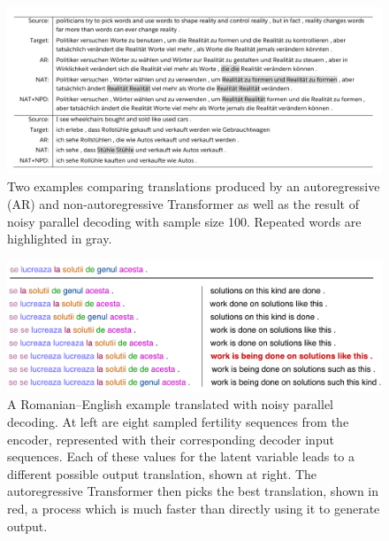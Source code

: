 \begin{figure}[htpb]
\includegraphics[width=\textwidth]{figs/nat/examples1}
\caption{\label{cp8.fig.ex} Two examples comparing translations produced by an autoregressive (AR) and non-autoregressive Transformer as well as the result of noisy parallel decoding with sample size 100. Repeated words are highlighted in gray.}
\end{figure}
\begin{figure}[htpb]
\centering
\includegraphics[width=\textwidth]{figs/nat/fertility_example2}
\caption{\label{cp8.fig.fer} A Romanian--English example translated with noisy parallel decoding. At left are eight sampled fertility sequences from the encoder, represented with their corresponding decoder input sequences. Each of these values for the latent variable leads to a different possible output translation, shown at right. The autoregressive Transformer then picks the best translation, shown in red, a process which is much faster than directly using it to generate output.}
\end{figure}

